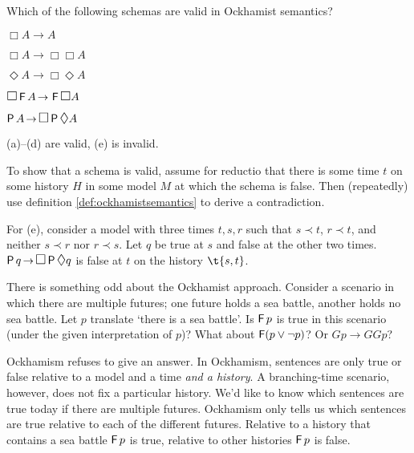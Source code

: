 \begin{exercise}
  Which of the following schemas are valid in Ockhamist semantics?
  \begin{exlist}
  \item $\Box A \to A$
  \item $\Box A \to \Box\Box A$
  \item $\Diamond A \to \Box\Diamond A$
  \item $\Box \tF A \to \tF\Box A$
  \item $\tP A \to \Box \tP \Diamond A$%
  \end{exlist}
\end{exercise}
\begin{solution}
  (a)--(d) are valid, (e) is invalid.

  To show that a schema is valid, assume for reductio that there is some time
  $t$ on some history $H$ in some model $M$ at which the schema is false. Then
  (repeatedly) use definition \ref{def:ockhamistsemantics} to derive a
  contradiction.

  For (e), consider a model with three times $t,s,r$ such that $s\prec t$,
  $r\prec t$, and neither $s \prec r$ nor $r\prec s$. Let $q$ be true at $s$ and
  false at the other two times. $\tP q \to \Box \tP \Diamond q$ is false at $t$
  on the history $\t{s,t}$.
\end{solution}

There is something odd about the Ockhamist approach. Consider a scenario in
which there are multiple futures; one future holds a sea battle, another holds
no sea battle. Let $p$ translate `there is a sea battle'. Is $\operatorname{\mathsf{F}} p$ is true in
this scenario (under the given interpretation of $p$)? What about
$\operatorname{\mathsf{F}}(p \lor \neg p)$? Or $Gp \to GGp$?

Ockhamism refuses to give an answer. In Ockhamism, sentences are only true or
false relative to a model and a time \emph{and a history}. A branching-time
scenario, however, does not fix a particular history. We'd like to know which
sentences are true today if there are multiple futures. Ockhamism only tells us
which sentences are true relative to each of the different futures. Relative to
a history that contains a sea battle $\operatorname{\mathsf{F}} p$ is true, relative to other
histories $\operatorname{\mathsf{F}} p$ is false.


